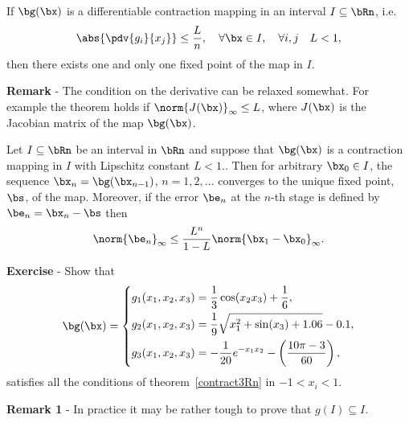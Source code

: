 \begin{theorem}
\label{contract3Rn}
If $\bg(\bx)$ is a differentiable contraction mapping
in an interval $I \subseteq \bRn$, i.e.
%
\begin{equation*}
  \abs{\pdv{g_i}{x_j}} \le \frac{L}{n}, \quad
  \forall \bx \in I, \quad \forall i,j \quad L < 1 ,
\end{equation*}
%
then there exists one and only one fixed point of the map in $I$.
\end{theorem}

\noindent
\textbf{Remark} - The condition on the derivative can be relaxed
somewhat.   For example the theorem holds if $\norm{J(\bx)}_\infty \le
L$, where $J(\bx)$ is the Jacobian matrix of the map $\bg(\bx)$.

\smallskip

\begin{theorem}
\label{contract4Rn}
Let $I \subseteq \bRn$ be an interval in $\bRn$ and suppose that
$\bg(\bx)$ is a contraction mapping in $I$ with Lipschitz constant $L
< 1$..  Then for arbitrary $\bx_0 \in I$, the sequence $\bx_n =
\bg(\bx_{n-1})$, $n=1,2,\ldots$ converges to the unique fixed point,
$\bs$, of the map.  Moreover, if the error $\be_n$ at the $n$-th stage
is defined by $\be_n = \bx_n - \bs$ then
%
\begin{equation*}
  \norm{ \be_n }_\infty \le \frac{L^n}{1-L} \norm{ \bx_1 - \bx_0 }_\infty .
\end{equation*}
%
\end{theorem}

\smallskip

\noindent
\textbf{Exercise} - Show that
%
\begin{equation}
  \label{eq:contRnex}
  \bg(\bx) = \left\{
    \begin{aligned}
      g_1(x_1,x_2,x_3) & = \dfrac{1}{3} \cos(x_2 x_3) + \dfrac{1}{6} , \\
      g_2(x_1,x_2,x_3) & =
      \dfrac{1}{9} \sqrt{x_1^2 + \sin(x_3) + 1.06} - 0.1, \\
      g_3(x_1,x_2,x_3) & =
      -\dfrac{1}{20} e^{-x_1 x_2} - \left ( \dfrac{10 \pi -3}{60} \right ),
    \end{aligned}
    \right.
\end{equation}
%
satisfies all the conditions of theorem~\ref{contract3Rn} in $-1 < x_i <
1$.

\smallskip

\noindent
\textbf{Remark 1} - In practice it may be rather tough to prove that
$g(I) \subseteq I$.

